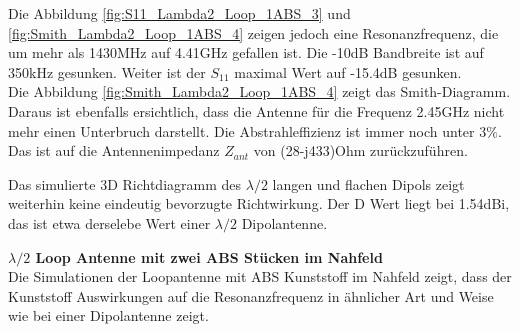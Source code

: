 Die Abbildung \ref{fig:S11_Lambda2_Loop_1ABS_3} und \ref{fig:Smith_Lambda2_Loop_1ABS_4} zeigen jedoch eine Resonanzfrequenz, die um mehr als 1430MHz auf 4.41GHz gefallen ist. Die -10dB Bandbreite ist auf 350kHz gesunken. Weiter ist der $S_{11}$ maximal Wert auf -15.4dB gesunken.\\
Die Abbildung \ref{fig:Smith_Lambda2_Loop_1ABS_4} zeigt das Smith-Diagramm. Daraus ist ebenfalls ersichtlich, dass die Antenne für die Frequenz 2.45GHz nicht mehr einen Unterbruch darstellt. Die Abstrahleffizienz ist immer noch unter $3\%$. Das ist auf die Antennenimpedanz $Z_{ant}$ von (28-j433)Ohm zurückzuführen.


Das simulierte 3D Richtdiagramm des $\lambda/2$ langen und flachen Dipols zeigt weiterhin keine eindeutig bevorzugte Richtwirkung. Der D Wert liegt bei 1.54dBi, das ist etwa derselebe Wert einer $\lambda/2$ Dipolantenne. 

\textbf{$\lambda/2$ Loop Antenne mit zwei ABS Stücken im Nahfeld}\\
Die Simulationen der Loopantenne mit ABS Kunststoff im Nahfeld  zeigt, dass der Kunststoff  Auswirkungen auf die Resonanzfrequenz in ähnlicher Art und Weise wie bei einer Dipolantenne zeigt.\\

